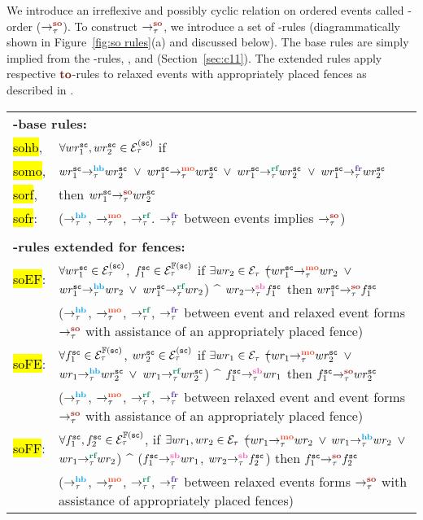 We introduce an irreflexive and possibly cyclic relation
on \sc ordered events called \sc-order ($\setSO$).
%
To construct $\setSO$, we introduce a set of \lso-rules
(diagrammatically shown in Figure~\ref{fig:so rules}(a) and
discussed below).
%
The \lso base rules are simply implied from
the \lto-rules, ,   
and  (Section~\ref{sec:c11}).
%
The extended rules apply respective $\lto$-rules to relaxed
events with appropriately placed fences as described in
\cc \cite{C11}\cite{Batty-POPL12}.

\begin{longtable}{|p{} p{}|}
	\hline
	\multicolumn{2}{|l|}{\bf \lso-base rules:}\\
	
	\hl{sohb}, & 
	$\forall wr^{\texttt{sc}}_1, wr^{\texttt{sc}}_2 \in \mathcal{E}^{(\texttt{sc})}_\tau$ if \\
	\hl{somo}, &
	$\hb{\tau}{wr^{\sc}_1}{wr^{\sc}_2}$ $\vee$ $\mo{\tau}{wr^{\sc}_1}{wr^{\sc}_2}$
	$\vee$ $\rf{\tau}{wr^{\sc}_1}{wr^{\sc}_2}$ 
	$\vee$ $\fr{\tau}{wr^{\sc}_1}{wr^{\sc}_2}$\\
	\hl{sorf}, & 
	then $\so{\tau}{wr^{\sc}_1}{wr^{\sc}_2}$ \\
	\hl{sofr}: & ($\setHB$, $\setMO$, $\setRF$. $\setFR$ between \sc events 
				implies $\setSO$) \\
	& \\
	
	\multicolumn{2}{|l|}{\bf \lso-rules extended for fences:} \\
	
	\hl{soEF}: & $\forall wr^\texttt{sc}_1 \in \mathcal{E}^{(\texttt{sc})}_\tau$, $f^\texttt{sc}_1 \in
	\mathcal{E}^{\mathbb{F}(\texttt{sc})}_\tau$ if $\exists wr_2 \in \mathcal{E}_\tau$ \st 
	($\mo{\tau}{wr^\sc_1}{wr_2}$ $\vee$ $\hb{\tau}{wr^\sc_1}{wr_2}$
	$\vee$ $\rf{\tau}{wr^\sc_1}{wr_2}$) $\^$ $\seqb{\tau}{wr_2}{f^\sc_1}$ 
	then $\so{\tau}{wr^\sc_1}{f^\sc_1}$ \\
	& ($\setHB$, $\setMO$, $\setRF$, $\setFR$ between \sc event and relaxed 
		event forms $\setSO$ with assistance of an appropriately placed 
		fence) \\
	
	\hl{soFE}: & $\forall f^\texttt{sc}_1 \in \mathcal{E}^{\mathbb{F}(\texttt{sc})}_\tau$, $wr^\texttt{sc}_2 \in
	\mathcal{E}^{(\texttt{sc})}_\tau$ if $\exists wr_1 \in \mathcal{E}_\tau$ \st 
	($\mo{\tau}{wr_1}{wr^\sc_2}$ $\vee$ $\hb{\tau}{wr_1}{wr^\sc_2}$
	$\vee$ $\rf{\tau}{wr_1}{wr^\sc_2}$) $\^$ $\seqb{\tau}{f^\sc_1}{wr_1}$ 
	then $\so{\tau}{f^\sc_1}{wr^\sc_2}$ \\
	& ($\setHB$, $\setMO$, $\setRF$, $\setFR$ between relaxed event and
	\sc event forms $\setSO$ with assistance of an appropriately placed 
	fence) \\
	
	\hl{soFF}: & $\forall f^{\texttt{sc}}_1, f^{\texttt{sc}}_2 \in \mathcal{E}^{\mathbb{F}(\texttt{sc})}_\tau$, 
	if $\exists wr_1, wr_2 \in \mathcal{E}_\tau$ \st 
	($\mo{\tau}{wr_1}{wr_2}$ $\vee$ $\hb{\tau}{wr_1}{wr_2}$
	$\vee$ $\rf{\tau}{wr_1}{wr_2}$) $\^$
	($\seqb{\tau}{f^{\sc}_1}{wr_1}$, $\seqb{\tau}{wr_2}{f^{\sc}_2}$) 
	then $\so{\tau}{f^{\sc}_1}{f^{\sc}_2}$ \\
	& ($\setHB$, $\setMO$, $\setRF$, $\setFR$ between relaxed events 
		forms $\setSO$ with assistance of appropriately placed fences) \\
	\hline
\end{longtable}

